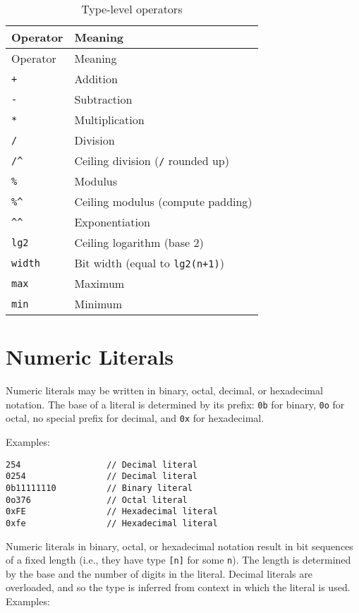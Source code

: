 \begin{longtable}[]{@{}ll@{}}
\caption{Type-level operators}\tabularnewline
\toprule
Operator & Meaning \\
\midrule
\endfirsthead
\toprule
Operator & Meaning \\
\midrule
\endhead
\texttt{+} & Addition \\
\texttt{-} & Subtraction \\
\texttt{*} & Multiplication \\
\texttt{/} & Division \\
\texttt{/\^{}} & Ceiling division (\texttt{/} rounded up) \\
\texttt{\%} & Modulus \\
\texttt{\%\^{}} & Ceiling modulus (compute padding) \\
\texttt{\^{}\^{}} & Exponentiation \\
\texttt{lg2} & Ceiling logarithm (base 2) \\
\texttt{width} & Bit width (equal to \texttt{lg2(n+1)}) \\
\texttt{max} & Maximum \\
\texttt{min} & Minimum \\
\bottomrule
\end{longtable}

\hypertarget{numeric-literals}{%
\section{Numeric Literals}\label{numeric-literals}}

Numeric literals may be written in binary, octal, decimal, or
hexadecimal notation. The base of a literal is determined by its prefix:
\texttt{0b} for binary, \texttt{0o} for octal, no special prefix for
decimal, and \texttt{0x} for hexadecimal.

Examples:

\begin{verbatim}
254                 // Decimal literal
0254                // Decimal literal
0b11111110          // Binary literal
0o376               // Octal literal
0xFE                // Hexadecimal literal
0xfe                // Hexadecimal literal
\end{verbatim}

Numeric literals in binary, octal, or hexadecimal notation result in bit
sequences of a fixed length (i.e., they have type \texttt{{[}n{]}} for
some \texttt{n}). The length is determined by the base and the number of
digits in the literal. Decimal literals are overloaded, and so the type
is inferred from context in which the literal is used. Examples:


